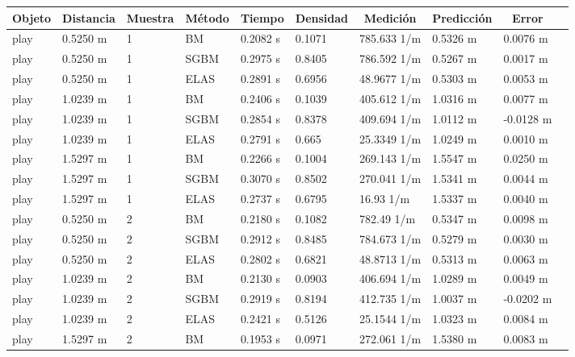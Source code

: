 \documentclass[11pt,a4paper,titlepage]{article}
\begin{document}
\begin{table}[!ht]
\small
\centering
\hspace*{-2cm}
\begin{tabular}{@{}llllllllll@{}}
\multicolumn{1}{c}{Objeto} & \multicolumn{1}{c}{Distancia} & \multicolumn{1}{c}{Muestra} & \multicolumn{1}{c}{Método} & \multicolumn{1}{c}{Tiempo} & \multicolumn{1}{c}{Densidad} & \multicolumn{1}{c}{Medición} & \multicolumn{1}{c}{Predicción} & \multicolumn{1}{c}{Error} \\ \midrule
play & 0.5250 m & 1 & BM & 0.2082 s & 0.1071 & 785.633 1/m & 0.5326 m & 0.0076 m \\ \midrule
play & 0.5250 m & 1 & SGBM & 0.2975 s & 0.8405 & 786.592 1/m & 0.5267 m & 0.0017 m \\ \midrule
play & 0.5250 m & 1 & ELAS & 0.2891 s & 0.6956 & 48.9677 1/m & 0.5303 m & 0.0053 m \\ \midrule
play & 1.0239 m & 1 & BM & 0.2406 s & 0.1039 & 405.612 1/m & 1.0316 m & 0.0077 m \\ \midrule
play & 1.0239 m & 1 & SGBM & 0.2854 s & 0.8378 & 409.694 1/m & 1.0112 m & -0.0128 m \\ \midrule
play & 1.0239 m & 1 & ELAS & 0.2791 s & 0.665 & 25.3349 1/m & 1.0249 m & 0.0010 m \\ \midrule
play & 1.5297 m & 1 & BM & 0.2266 s & 0.1004 & 269.143 1/m & 1.5547 m & 0.0250 m \\ \midrule
play & 1.5297 m & 1 & SGBM & 0.3070 s & 0.8502 & 270.041 1/m & 1.5341 m & 0.0044 m \\ \midrule
play & 1.5297 m & 1 & ELAS & 0.2737 s & 0.6795 & 16.93 1/m & 1.5337 m & 0.0040 m \\ \midrule
play & 0.5250 m & 2 & BM & 0.2180 s & 0.1082 & 782.49 1/m & 0.5347 m & 0.0098 m \\ \midrule
play & 0.5250 m & 2 & SGBM & 0.2912 s & 0.8485 & 784.673 1/m & 0.5279 m & 0.0030 m \\ \midrule
play & 0.5250 m & 2 & ELAS & 0.2802 s & 0.6821 & 48.8713 1/m & 0.5313 m & 0.0063 m \\ \midrule
play & 1.0239 m & 2 & BM & 0.2130 s & 0.0903 & 406.694 1/m & 1.0289 m & 0.0049 m \\ \midrule
play & 1.0239 m & 2 & SGBM & 0.2919 s & 0.8194 & 412.735 1/m & 1.0037 m & -0.0202 m \\ \midrule
play & 1.0239 m & 2 & ELAS & 0.2421 s & 0.5126 & 25.1544 1/m & 1.0323 m & 0.0084 m \\ \midrule
play & 1.5297 m & 2 & BM & 0.1953 s & 0.0971 & 272.061 1/m & 1.5380 m & 0.0083 m \\ \midrule

\end{tabular}
\end{table}
\end{document}
